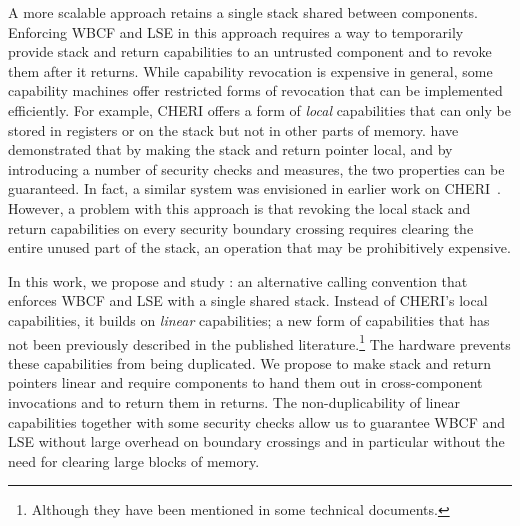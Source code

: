 \documentclass[acmsmall,review,showframe]{acmart}\settopmatter{printfolios=true,printccs=false,printacmref=false}
\begin{document}
A more scalable approach retains a single stack shared between components.
Enforcing WBCF and LSE in this approach requires a way to temporarily provide stack and return capabilities to an untrusted component and to revoke them after it returns.
While capability revocation is expensive in general, some capability machines offer restricted forms of revocation that can be implemented efficiently.
For example, CHERI offers a form of {\itshape local} capabilities that can only be stored in registers or on the stack but not in other parts of memory.
\citet{skorstengaard_reasoning_2017} have demonstrated that by making the stack and return pointer local, and by introducing a number of security checks and measures, the two properties can be guaranteed.
In fact, a similar system was envisioned in earlier work on CHERI~\citep{watson2012cheri}. 
However, a problem with this approach is that revoking the local stack and return capabilities on every security boundary crossing requires clearing the entire unused part of the stack, an operation that may be prohibitively expensive.

In this work, we propose and study \stktokens{}: an alternative calling convention that enforces WBCF and LSE with a single shared stack.
Instead of CHERI's local capabilities, it builds on {\itshape linear} capabilities; a new form of capabilities that has not been previously described in the published literature.\footnote{Although they have been mentioned in some technical documents.}
The hardware prevents these capabilities from being duplicated.
We propose to make stack and return pointers linear and require components to hand them out in cross-component invocations and to return them in returns.
The non-duplicability of linear capabilities together with some security checks allow us to guarantee WBCF and LSE without large overhead on boundary crossings and in particular without the need for clearing large blocks of memory.
\end{document}
